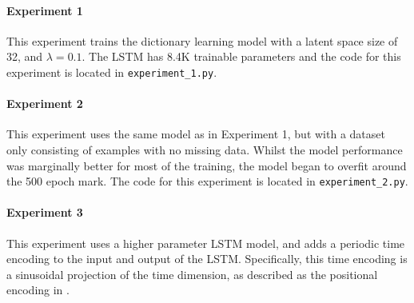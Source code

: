 \documentclass[twocolumn, 9pt]{extarticle}
\begin{document}
\paragraph{Experiment 1} This experiment trains the dictionary learning model with a latent space size of 32, and $\lambda = 0.1$. The LSTM has 8.4K trainable parameters and the code for this experiment is located in \texttt{experiment\_1.py}.

\paragraph{Experiment 2} This experiment uses the same model as in Experiment 1, but with a dataset only consisting of examples with no missing data. Whilst the model performance was marginally better for most of the training, the model began to overfit around the 500 epoch mark. The code for this experiment is located in \texttt{experiment\_2.py}.

\paragraph{Experiment 3} This experiment uses a higher parameter LSTM model, and adds a periodic time encoding to the input and output of the LSTM. Specifically, this time encoding is a sinusoidal projection of the time dimension, as described as the positional encoding in \cite{vaswani2017attention}.


\end{document}
